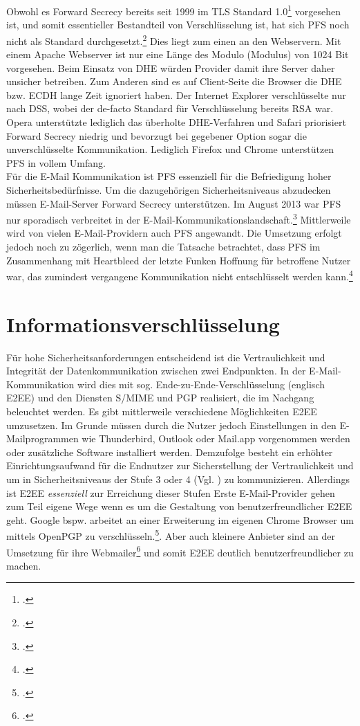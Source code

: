 \documentclass  [paper=a4,
				fontsize=12pt,
				listof=totoc,
				bibliography=totoc
				]{scrreprt}
\begin{document}
				Obwohl es Forward Secrecy bereits seit 1999 im \ac{TLS} Standard 1.0\footcite[Vgl.][]{Boeck2013} vorgesehen ist, und somit essentieller Bestandteil von Verschlüsselung ist, hat sich \ac{PFS} noch nicht als Standard durchgesetzt.\footcite[Vgl.][]{SSLLabs} Dies liegt zum einen an den Webservern. Mit einem Apache Webserver ist nur eine Länge des Modulo (Modulus) von 1024 Bit vorgesehen. Beim Einsatz von \ac{DHE} würden Provider damit ihre Server daher unsicher betreiben. Zum Anderen sind es auf Client-Seite die Browser die \ac{DHE} bzw. \ac{ECDH} lange Zeit ignoriert haben. Der Internet Explorer verschlüsselte nur nach DSS, wobei der de-facto Standard für Verschlüsselung bereits \ac{RSA} war. Opera unterstützte lediglich das überholte \ac{DHE}-Verfahren und Safari priorisiert Forward Secrecy niedrig und bevorzugt bei gegebener Option sogar die unverschlüsselte Kommunikation. Lediglich Firefox und Chrome unterstützen \ac{PFS} in vollem Umfang.\medskip\\
				Für die E-Mail Kommunikation ist \ac{PFS} essenziell für die Befriedigung hoher Sicherheitsbedürfnisse. Um die dazugehörigen Sicherheitsniveaus abzudecken müssen E-Mail-Server Forward Secrecy unterstützen. Im August 2013 war \ac{PFS} nur sporadisch verbreitet in der E-Mail-Kommunikationslandschaft.\footcite[Vgl.][]{Schulz2014} Mittlerweile wird von vielen E-Mail-Providern auch \ac{PFS} angewandt. Die Umsetzung erfolgt jedoch noch zu zögerlich, wenn man die Tatsache betrachtet, dass \ac{PFS} im Zusammenhang mit Heartbleed der letzte Funken Hoffnung für betroffene Nutzer war, das zumindest vergangene Kommunikation nicht entschlüsselt werden kann.\footcite[Vgl.][]{Zhu2014}
		
		\section{Informationsverschlüsselung}
			Für hohe Sicherheitsanforderungen entscheidend ist die Vertraulichkeit und Integrität der Datenkommunikation zwischen zwei Endpunkten. In der E-Mail-Kommunikation wird dies mit sog. Ende-zu-Ende-Verschlüsselung (englisch \ac{E2EE}) und den Diensten \ac{S/MIME} und \ac{PGP} realisiert, die im Nachgang beleuchtet werden.
			Es gibt mittlerweile verschiedene Möglichkeiten \ac{E2EE} umzusetzen. Im Grunde müssen durch die Nutzer jedoch Einstellungen in den E-Mailprogrammen wie Thunderbird, Outlook oder Mail.app vorgenommen werden oder zusätzliche Software installiert werden. Demzufolge besteht ein erhöhter Einrichtungsaufwand für die Endnutzer zur Sicherstellung der Vertraulichkeit und um in Sicherheitsniveaus der Stufe 3 oder 4 (Vgl. ) zu kommunizieren. Allerdings ist \ac{E2EE} \textit{essenziell} zur Erreichung dieser Stufen\medskip
			Erste E-Mail-Provider gehen zum Teil eigene Wege wenn es um die Gestaltung von benutzerfreundlicher \ac{E2EE} geht. Google bspw. arbeitet an einer Erweiterung im eigenen Chrome Browser um mittels OpenPGP zu verschlüsseln.\footcite[Vgl.][]{Somogyi2013}. Aber auch kleinere Anbieter sind an der Umsetzung für ihre Webmailer\footcite[Vgl.][]{Posteo2013} und somit \ac{E2EE} deutlich benutzerfreundlicher zu machen. 
			
\end{document}
